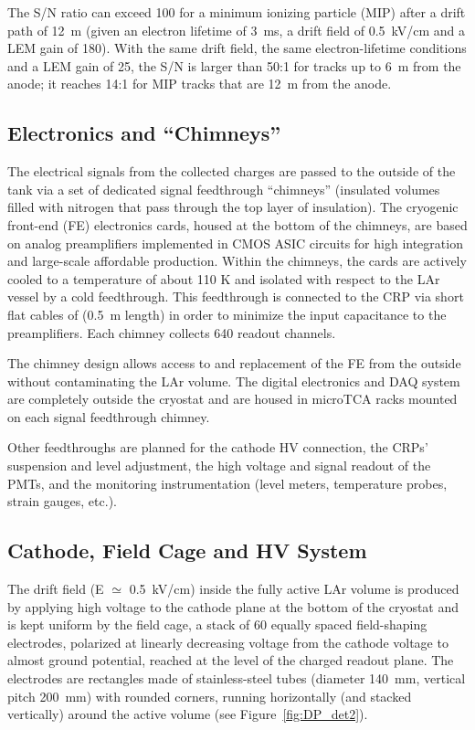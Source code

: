 The S/N ratio can exceed 100 for a minimum
ionizing particle (MIP) after a drift path of 12~m (given an
electron lifetime of 3~ms, a drift field of 0.5~kV/cm and a LEM gain
of 180). With the same drift field, the same electron-lifetime conditions and a
LEM gain of 25, the S/N is larger than 50:1 for tracks up to 6~m from
the anode; it reaches 14:1 for MIP tracks that are 12~m from the
anode.

\subsection{Electronics and ``Chimneys''}
 
The electrical signals from the collected charges
are passed to the outside of the tank via a set of dedicated signal
feedthrough ``chimneys'' (insulated volumes filled with nitrogen
that pass through the top layer of insulation). 
The cryogenic front-end (FE) electronics cards, housed at the bottom of the
chimneys, are based on analog preamplifiers implemented in CMOS ASIC circuits for high integration and large-scale
affordable production. Within the chimneys, the cards are actively cooled to a temperature of about 110 K and
isolated with respect to the LAr vessel by a cold feedthrough.  This
feedthrough is connected to the CRP via short flat cables of (0.5~m length) in order to minimize the
input capacitance to the preamplifiers. Each chimney collects 640 readout channels.

The chimney design allows access to and replacement of the FE from the
outside without contaminating the LAr volume. The digital electronics
and DAQ system are completely outside the cryostat and are housed in
microTCA racks mounted on each signal feedthrough chimney. 

Other feedthroughs are planned for the cathode HV connection, the
CRPs' suspension and level adjustment, the high voltage and signal
readout of the PMTs, and the monitoring instrumentation (level meters,
temperature probes, strain gauges, etc.).

\subsection{Cathode, Field Cage and HV System}
\label{v4:fd-alt-ov:cathode}

The drift field (E ${\simeq}$ 0.5~kV/cm) inside the fully
active LAr volume is produced by applying high voltage to the cathode
plane at the bottom of the cryostat and is kept uniform by the field cage, a stack
of 60 equally spaced field-shaping electrodes, %
polarized at linearly decreasing voltage from the cathode 
voltage to almost ground potential, reached at the level of the charged readout plane.
The electrodes are rectangles made of stainless-steel tubes  (diameter 140~mm,  vertical pitch 200~mm)
with rounded corners, running horizontally (and stacked vertically) around the
active volume (see Figure~\ref{fig:DP_det2}). 

